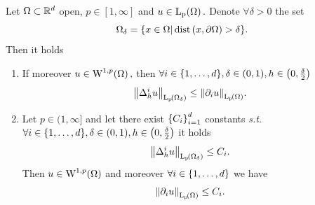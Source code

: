 \documentclass{article}
\begin{document}
\begin{theorem}
	Let $\Omega \subset {\mathbb R}^{d}$ open, $p \in [1,\infty]$ and $u \in \LpSet{\Omega}.$ Denote $\forall \delta>0$ the set
	\[
		\Omega_{\delta} = \qty{x \in \Omega | \operatorname{dist}\qty(x, \partial \Omega)>\delta}.
	\]
	Then it holds

	\begin{enumerate}
		\item If moreover $u \in \WkpSet[1][p]{\Omega},$ then $\forall i \in \qty{1, \dots, d}, \delta \in (0,1), h \in \qty(0,\frac{\delta}{2})$
			\[
				\norm{\Delta_h^i u}_{\LpSet{\Omega_{\delta}}}\leq \norm{\partial_{i}u}_{\LpSet{\Omega}}.
			\]
		\item Let $p \in (1, \infty]$ and let there exist $\qty{C_i}_{i=1}^d$ constants \textit{s.t.} $\forall i \in \qty{1, \dots, d}, \delta \in (0,1), h \in \qty(0, \frac{\delta}{2})$ it holds
			\[
				\norm{\Delta_h^i u}_{\LpSet{\Omega_{\delta}}}\leq C_i.
			\]
			Then $u \in \WkpSet[1][p]{\Omega}$ and moreover $\forall i \in \qty{1, \dots, d}$ we have
			\[
				\norm{\partial_{i}u}_{\LpSet{\Omega}} \leq C_i.
			\]
	\end{enumerate}
\end{theorem}
\end{document}
